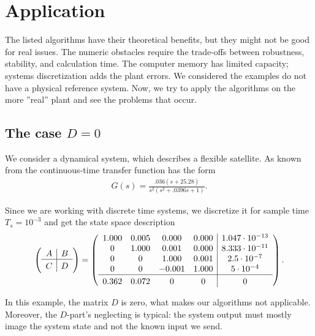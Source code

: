 \chapter{Application}
\label{ch:Allpication}

The listed algorithms have their theoretical benefits, but they might not be good for real issues. The numeric obstacles require the trade-offs between robustness, stability, and calculation time. The computer memory has limited capacity; systems discretization adds the plant errors. We considered the examples do not have a physical reference system. Now, we try to apply the algorithms on the more ''real'' plant and see the problems that occur. 


\section{The case $D = 0$}
		\begin{exam}
		 We consider a dynamical system, which describes a flexible satellite. As known from \cite{SchRC} the continuous-time transfer function has the form  
		\begin{align}
		G(s) = \frac{.036(s + 25.28)}{s^2(s^2 + .0396s + 1)}. 
		\end{align}
	
		
		Since we are working with discrete time systems, we discretize it for sample time $T_s = 10^{-3}$  and get the state space description 
		\begin{align}
		\label{eq:Appl:satellite_sys}
		\left( \begin{array}{c | c}
		A & B \\ \hline C & D
		\end{array}\right) = 
		\left(\begin{array}{c c c c | c}
	    1.000  &  0.005  &  0.000  &  0.000 & 1.047\cdot 10^{-13}\\
		0  &  1.000  &  0.001  &  0.000 & 8.333\cdot 10^{-11}\\
		0  &       0  &  1.000  &  0.001 & 2.5\cdot 10^{-7}\\
		0  &       0  & -0.001  &  1.000 & 5\cdot 10^{-4}\\ \hline
        0.362 & 0.072&  0 & 0 & 0
		\end{array}\right). 
	\end{align}
	\end{exam}

In this example, the matrix $D$ is zero, what makes our algorithms not applicable. 
Moreover, the  $D$-part's neglecting is typical: the system output must mostly image the system state and not the known input we send. 

